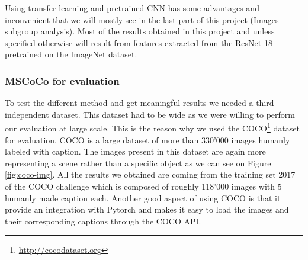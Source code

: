 \documentclass[a4paper]{article}
\begin{document}
Using transfer learning and pretrained CNN has some advantages and inconvenient that we will mostly see in the last part of this project (Images subgroup analysis). Most of the results obtained in this project and unless specified otherwise will result from features extracted from the ResNet-18 pretrained on the ImageNet dataset.


\subsubsection{MSCoCo for evaluation}

To test the different method and get meaningful results we needed a third independent dataset. This dataset had to be wide as we were willing to perform our evaluation at large scale. This is the reason why we used the COCO\footnote{\url{http://cocodataset.org}} dataset for evaluation. COCO is a large dataset of more than 330'000 images humanly labeled with caption. The images present in this dataset are again more representing a scene rather than a specific object as we can see on Figure \ref{fig:coco-img}. All the results we obtained are coming from the training set 2017 of the COCO challenge which is composed of roughly 118'000 images with 5 humanly made caption each. Another good aspect of using COCO is that it provide an integration with Pytorch and makes it easy to load the images and their corresponding captions through the COCO API.
\end{document}
